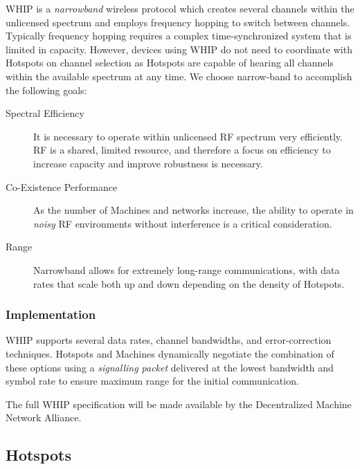 \documentclass[10pt, nonatbib, nocopyrightspace, reprint]{sigplanconf}
\begin{document}
WHIP is a \emph{narrowband} wireless protocol which creates several channels within the unlicensed spectrum and employs frequency hopping to switch between channels. Typically frequency hopping requires a complex time-synchronized system that is limited in capacity. However, devices using WHIP do not need to coordinate with Hotspots on channel selection as Hotspots are capable of hearing all channels within the available spectrum at any time. We choose narrow-band to accomplish the following goals:

\begin{description}

\item [Spectral Efficiency] It is necessary to operate within unlicensed RF spectrum very efficiently. RF is a shared, limited resource, and therefore a focus on efficiency to increase capacity and improve robustness is necessary.

\item [Co-Existence Performance] As the number of Machines and networks increase, the ability to operate in \emph{noisy} RF environments without interference is a critical consideration.

\item [Range] Narrowband allows for extremely long-range communications, with data rates that scale both up and down depending on the density of Hotspots.

\end{description}

\subsubsection{Implementation}

WHIP supports several data rates, channel bandwidths, and error-correction techniques. Hotspots and Machines dynamically negotiate the combination of these options using a \emph{signalling packet} delivered at the lowest bandwidth and symbol rate to ensure maximum range for the initial communication.

The full WHIP specification will be made available by the Decentralized Machine Network Alliance.

\subsection{Hotspots}\label{hotspots}
\end{document}

